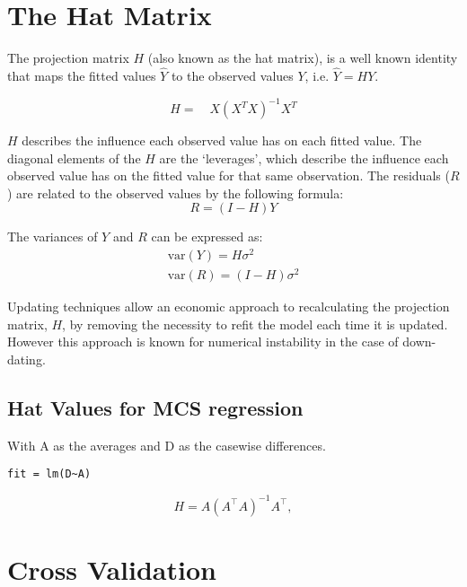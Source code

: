 \documentclass[12pt, a4paper]{report}
\theoremstyle{plain}
\theoremstyle{definition}
\theoremstyle{remark}
\begin{document}
\newpage
\section{The Hat Matrix} %

The projection matrix $H$ (also known as the hat matrix), is a
well known identity that maps the fitted values $\hat{Y}$ to the
observed values $Y$, i.e. $\hat{Y} = HY$.

\begin{equation}
H =\quad X(X^{T}X)^{-1}X^{T}
\end{equation}

$H$ describes the influence each observed value has on each fitted
value. The diagonal elements of the $H$ are the `leverages', which
describe the influence each observed value has on the fitted value
for that same observation. The residuals ($R$) are related to the
observed values by the following formula:
\begin{equation}
R = (I-H)Y
\end{equation}

The variances of $Y$ and $R$ can be expressed as:
\begin{eqnarray}
\mbox{var}(Y) = H\sigma^{2} \nonumber\\
\mbox{var}(R) = (I-H)\sigma^{2}
\end{eqnarray}

Updating techniques allow an economic approach to recalculating
the projection matrix, $H$, by removing the necessity to refit the
model each time it is updated. However this approach is known for
numerical instability in the case of down-dating.


\subsection{Hat Values for MCS regression}

With A as the averages and D as the casewise differences.
\begin{verbatim}
fit = lm(D~A)
\end{verbatim}

\begin{displaymath}
H = A \left(A^\top  A\right)^{-1} A^\top ,
\end{displaymath}

\newpage
\section{Cross Validation} %
\end{document}
